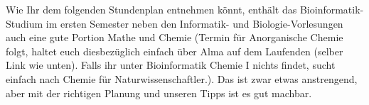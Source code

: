 Wie Ihr dem folgenden Stundenplan entnehmen könnt, enthält das Bioinformatik-Studium im ersten
Semester neben den Informatik- und Biologie-Vorlesungen auch eine gute Portion Mathe und Chemie (Termin für Anorganische Chemie folgt, haltet euch diesbezüglich einfach über Alma auf dem Laufenden (selber Link wie unten). Falls ihr unter Bioinformatik Chemie I nichts findet, sucht einfach nach Chemie für Naturwissenschaftler.).
Das ist zwar etwas anstrengend, aber mit der richtigen Planung und unseren Tipps ist es gut machbar.\\
\noindent{}

